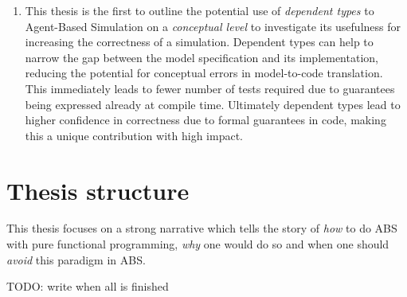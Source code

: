 \begin{enumerate}
	\item This thesis is the first to outline the potential use of \textit{dependent types} to Agent-Based Simulation on a \textit{conceptual level} to investigate its usefulness for increasing the correctness of a simulation. Dependent types can help to narrow the gap between the model specification and its implementation, reducing the potential for conceptual errors in model-to-code translation. This immediately leads to fewer number of tests required due to guarantees being expressed already at compile time. Ultimately dependent types lead to higher confidence in correctness due to formal guarantees in code, making this a unique contribution with high impact.
\end{enumerate}

\newpage

\section{Thesis structure}
This thesis focuses on a strong narrative which tells the story of \textit{how} to do ABS with pure functional programming, \textit{why} one would do so and when one should \textit{avoid} this paradigm in ABS.

TODO: write when all is finished